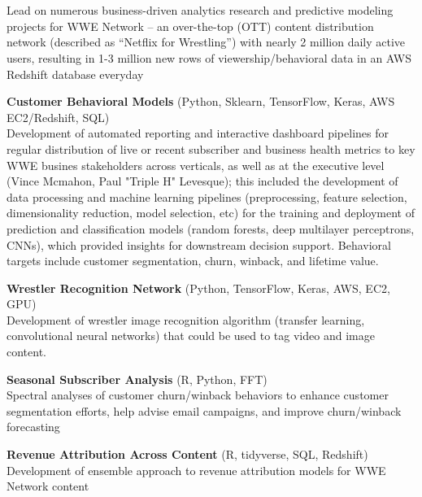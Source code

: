  \\  
 \\
  Lead on numerous business-driven analytics research and
  predictive modeling projects for WWE Network -- an
  over-the-top (OTT) content distribution network 
  (described as ``Netflix for Wrestling'') with nearly
  2 million daily active users, resulting in 1-3 million new rows of viewership/behavioral 
  data in an AWS Redshift database everyday
\begin{itemize*}
  \item\leftandright
    {\textbf{Customer Behavioral Models}}
    {\small{(Python, Sklearn, TensorFlow, Keras, AWS
    EC2/Redshift, SQL)}} \\  
    Development of automated reporting and interactive dashboard 
    pipelines for regular distribution of live or recent subscriber 
    and business health metrics to key WWE busines stakeholders
    across verticals, as well as at the executive level (Vince Mcmahon,
    Paul "Triple H" Levesque); this included the development of
    data processing and machine learning pipelines
    (preprocessing, feature selection, dimensionality reduction,
    model selection, etc) for the training and deployment of prediction and classification
    models (random forests, deep multilayer perceptrons,
    CNNs), which provided insights for downstream decision support.  Behavioral targets include
    customer segmentation, churn, winback, and lifetime value.        
  \item\leftandright
    {\textbf{Wrestler Recognition Network}}
    {\small{(Python, TensorFlow, Keras, AWS, EC2, GPU)}} \\  
    Development of wrestler image recognition algorithm (transfer learning,
    convolutional neural networks) that could be used to tag video
    and image content.
  \item\leftandright
    {\textbf{Seasonal Subscriber Analysis}}
    {\small{(R, Python, FFT)}} \\  
    Spectral analyses of customer churn/winback behaviors 
    to enhance customer segmentation efforts, help advise email campaigns, and
    improve churn/winback forecasting 
  \item\leftandright
    {\textbf{Revenue Attribution Across Content}}
    {\small{(R, tidyverse, SQL, Redshift)}} \\  
    Development of ensemble approach to revenue attribution models for WWE Network content

\end{itemize*}
